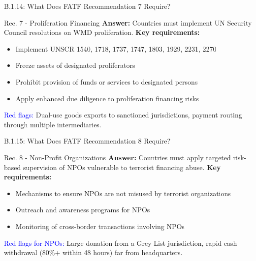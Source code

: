 \documentclass{beamer}
\begin{document}
	\begin{frame}{B.1.14: What Does FATF Recommendation 7 Require?}
		\begin{block}{Rec. 7 - Proliferation Financing}
			\textbf{Answer:} Countries must implement UN Security Council resolutions on WMD proliferation.
			\vspace{0.2cm}
			\textbf{Key requirements:}
			\begin{itemize}
				\item Implement UNSCR 1540, 1718, 1737, 1747, 1803, 1929, 2231, 2270
				\item Freeze assets of designated proliferators
				\item Prohibit provision of funds or services to designated persons
				\item Apply enhanced due diligence to proliferation financing risks
			\end{itemize}
			\textcolor{blue}{Red flags:} Dual-use goods exports to sanctioned jurisdictions, payment routing through multiple intermediaries.
		\end{block}
	\end{frame}
	
	\begin{frame}{B.1.15: What Does FATF Recommendation 8 Require?}
		\begin{block}{Rec. 8 - Non-Profit Organizations}
			\textbf{Answer:} Countries must apply targeted risk-based supervision of NPOs vulnerable to terrorist financing abuse.
			\vspace{0.2cm}
			\textbf{Key requirements:}
			\begin{itemize}
				\item Mechanisms to ensure NPOs are not misused by terrorist organizations
				\item Outreach and awareness programs for NPOs
				\item Monitoring of cross-border transactions involving NPOs
			\end{itemize}
			\textcolor{blue}{Red flags for NPOs:} Large donation from a Grey List jurisdiction, rapid cash withdrawal (80\%+ within 48 hours) far from headquarters.
		\end{block}
	\end{frame}
	
\end{document}
